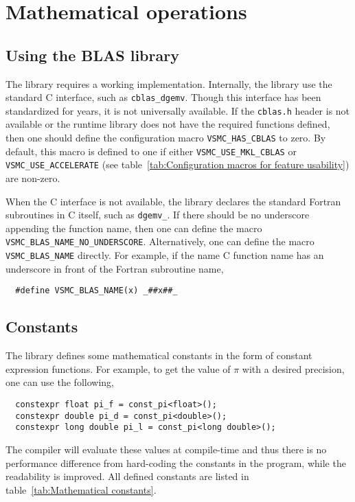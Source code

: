 \chapter{Mathematical operations}
\label{chap:Mathemtical operations}

\section{Using the BLAS library}
\label{sec:Using the BLAS library}

The library requires a working \blas implementation. Internally, the library
use the standard C interface, such as \verb|cblas_dgemv|. Though this interface
has been standardized for years, it is not universally available. If the
\verb|cblas.h| header is not available or the runtime library does not have the
required functions defined, then one should define the configuration macro
\verb|VSMC_HAS_CBLAS| to zero. By default, this macro is defined to one if
either \verb|VSMC_USE_MKL_CBLAS| or \verb|VSMC_USE_ACCELERATE| (see
table~\ref{tab:Configuration macros for feature usability}) are non-zero.

When the C interface is not available, the library declares the standard
Fortran subroutines in C itself, such as \verb|dgemv_|. If there should be no
underscore appending the function name, then one can define the macro
\verb|VSMC_BLAS_NAME_NO_UNDERSCORE|. Alternatively, one can define the macro
\verb|VSMC_BLAS_NAME| directly. For example, if the name C function name has
an underscore in front of the Fortran subroutine name,
\begin{Verbatim}
  #define VSMC_BLAS_NAME(x) _##x##_
\end{Verbatim}

\section{Constants}
\label{sec:Constants}

The library defines some mathematical constants in the form of constant
expression functions. For example, to get the value of $\pi$ with a desired
precision, one can use the following,
\begin{Verbatim}
  constexpr float pi_f = const_pi<float>();
  constexpr double pi_d = const_pi<double>();
  constexpr long double pi_l = const_pi<long double>();
\end{Verbatim}
The compiler will evaluate these values at compile-time and thus there is no
performance difference from hard-coding the constants in the program, while the
readability is improved. All defined constants are listed in
table~\ref{tab:Mathematical constants}.

